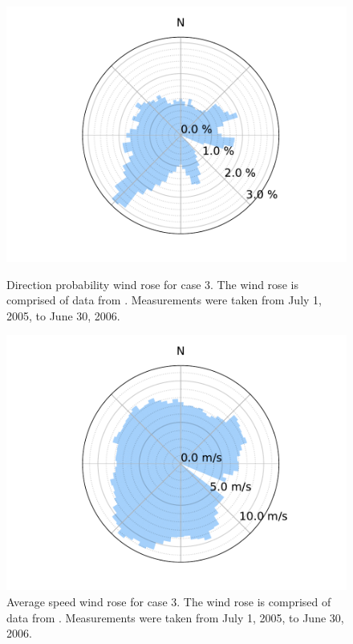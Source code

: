\documentclass[a4paper]{jpconf}
\begin{document}
\begin{figure}[h!]
	\centering
	\begin{minipage}[t]{18pc}
		\centering
		\includegraphics[width=\textwidth, trim={1.5cm 0cm 1.5cm 0cm}, clip]{final_images/windroses/freqwindrose_72_dir.pdf}
		\caption{Direction probability wind rose for case 3. The wind rose is comprised of data from \cite{noordzeewind2006}. Measurements were taken from July 1, 2005, to June 30, 2006.}
		\label{fig:freqwindrose_72dir}
	\end{minipage} \hspace{1pc}%
	\begin{minipage}[t]{18pc}
		\centering
		\includegraphics[width=1.\textwidth, trim={1.5cm, 0cm, 1.5cm, 0cm}, clip]{final_images/windroses/speedwindrose_72_dir.pdf}
		\caption{Average speed wind rose for case 3. The wind rose is comprised of data from \cite{noordzeewind2006}. Measurements were taken from July 1, 2005, to June 30, 2006.}
		\label{fig:speedwindrose_72dir}
	\end{minipage}
\end{figure}
\end{document}
